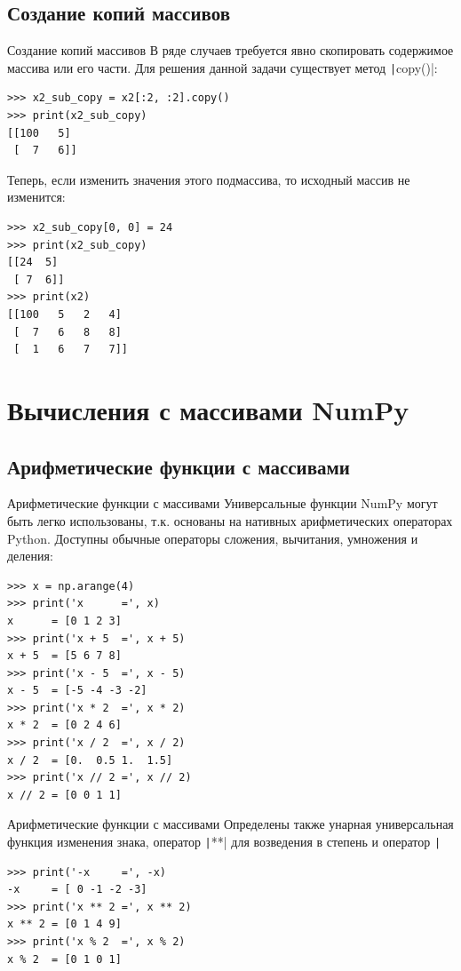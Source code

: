 \documentclass[aspectratio=169, mathserif]{beamer}%
\begin{document}
\subsection{Создание копий массивов}
\begin{frame}[fragile]{Создание копий массивов}
\scriptsize
В ряде случаев требуется явно скопировать содержимое массива или его части. Для решения данной задачи существует метод \texttt|copy()|:

\begin{verbatim}
>>> x2_sub_copy = x2[:2, :2].copy()
>>> print(x2_sub_copy)
[[100   5]
 [  7   6]]
\end{verbatim}

Теперь, если изменить значения этого подмассива, то исходный массив не изменится:

\begin{verbatim}
>>> x2_sub_copy[0, 0] = 24
>>> print(x2_sub_copy)
[[24  5]
 [ 7  6]]
>>> print(x2)
[[100   5   2   4]
 [  7   6   8   8]
 [  1   6   7   7]]
\end{verbatim}
\vfill
\end{frame}

\section{Вычисления с массивами NumPy}
\sectionframe

\subsection{Арифметические функции с массивами}
\begin{frame}[fragile]{Арифметические функции с массивами}
\scriptsize
Универсальные функции NumPy могут быть легко использованы, т.к. основаны на нативных арифметических операторах Python. Доступны обычные операторы сложения, вычитания, умножения и деления:

\begin{verbatim}
>>> x = np.arange(4)
>>> print('x      =', x)
x      = [0 1 2 3]
>>> print('x + 5  =', x + 5)
x + 5  = [5 6 7 8]
>>> print('x - 5  =', x - 5)
x - 5  = [-5 -4 -3 -2]
>>> print('x * 2  =', x * 2)
x * 2  = [0 2 4 6]
>>> print('x / 2  =', x / 2)
x / 2  = [0.  0.5 1.  1.5]
>>> print('x // 2 =', x // 2)
x // 2 = [0 0 1 1]
\end{verbatim}
\vfill
\end{frame}

\begin{frame}[fragile]{Арифметические функции с массивами}
\scriptsize
Определены также унарная универсальная функция изменения знака, оператор \texttt|**| для возведения в степень и оператор \texttt|%
\begin{verbatim}
>>> print('-x     =', -x)
-x     = [ 0 -1 -2 -3]
>>> print('x ** 2 =', x ** 2)
x ** 2 = [0 1 4 9]
>>> print('x % 2  =', x % 2)
x % 2  = [0 1 0 1]
\end{verbatim}
\vfill
\end{frame}
\end{document}
